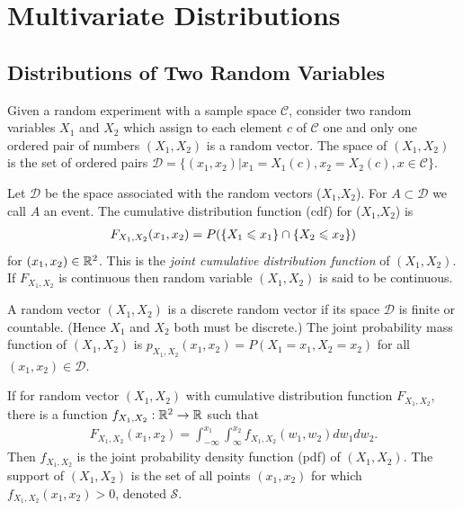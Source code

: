 \chapter{Multivariate Distributions}

\section{Distributions of Two Random Variables}

\begin{definition}{}{}
    Given a random experiment with a sample space $\mathcal{C}$,
    consider two random variables $X_1$ and $X_2$ which assign to each element $c$
    of $\mathcal{C}$ one and only one ordered pair of numbers $(X_1,X_2)$ is a random vector.
    The space of $(X_1,X_2)$ is the set of ordered pairs $\mathcal{D}=\{(x_1,x_2)|x_1=X_1(c),x_2=X_2(c),x\in\mathcal{C}\}$.
\end{definition}

\begin{definition}{}{}
    Let $\mathcal{D}$ be the space 
    associated with the random vectors ($X_1$,$X_2$).
    For $A\subset \mathcal{D}$ we call $A$ an event.
    The cumulative distribution function (cdf) for ($X_1$,$X_2$) is 
    \begin{align}
        F_{X_1,X_2}(x_1,x_2)=P(\{X_1\leqslant x_1\}\cap \{X_2\leqslant x_2\})
    \end{align}
    for $(x_1,x_2)\in \mathbb{R}^2$. This is the \textit{joint cumulative distribution function} of $(X_1,X_2)$.
    If $F_{X_1,X_2}$ is continuous then random variable $(X_1,X_2)$ is said to be continuous.
\end{definition}

\begin{definition}{}{}
    A random vector $(X_1,X_2)$ is a discrete random vector if its space 
    $\mathcal{D}$ is finite or countable. (Hence $X_1$ and $X_2$ both must be discrete.)
    The joint probability mass function of $(X_1,X_2)$ is $p_{X_1,X_2}(x_1,x_2)=P(X_1=x_1,X_2=x_2)$
    for all $(x_1,x_2)\in\mathcal{D}$.
\end{definition}

\begin{definition}{}{}
    If for random vector $(X_1,X_2)$ with cumulative distribution function $F_{X_1,X_2}$,
    there is a function $f_{X_1,X_2}:\mathbb{R}^2\rightarrow \mathbb{R}$ such that 
    \begin{align*}
        F_{X_1,X_2}(x_1,x_2)=\int_{-\infty}^{x_1}\int_{\infty}^{x_2} f_{X_1,X_2}(w_1,w_2)dw_1dw_2.
    \end{align*}
    Then $f_{X_1,X_2}$ is the joint probability density function (pdf) of $(X_1,X_2)$.
    The support of $(X_1,X_2)$ is the set of all points $(x_1,x_2)$ for which $f_{X_1,X_2}(x_1,x_2)>0$,
    denoted $\mathcal{S}$.
\end{definition}


